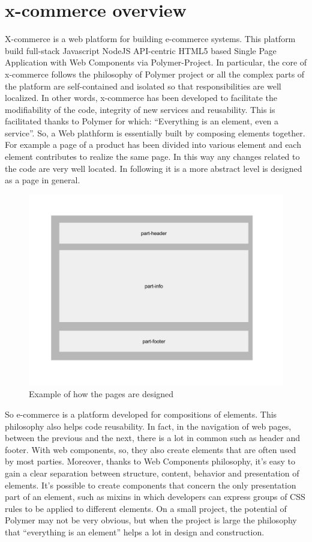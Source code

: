 \section{x-commerce overview}
\label{sec:x_commerce_overview}
X-commerce is a web platform for building e-commerce systems. This platform build full-stack Javascript NodeJS API-centric HTML5 based Single Page Application with Web Components via Polymer-Project. In particular, the core of x-commerce follows the philosophy of Polymer project or all the complex parts of the platform are self-contained and isolated so that responsibilities are well localized. In other words, x-commerce has been developed to facilitate the modifiability of the code, integrity of new services and reusability. This is facilitated thanks to Polymer for which: “Everything is an element, even a service”.
So, a Web plathform is essentially built by composing elements together.
\newline
For example a page of a product has been divided into various element and each element contributes to realize the same page. In this way any changes related to the code are very well located. In following it is a more abstract level is designed as a page in general.
\begin{figure}[htb]
 \centering
 \includegraphics[width=1.0\linewidth]{images/chapter3/design-page.jpg}\hfill
 \caption[Design page]{Example of how the pages are designed}
 \label{fig:design_page}
\end{figure}
So e-commerce is a platform developed for compositions of elements. This philosophy also helps code reusability. In fact, in the navigation of web pages, between the previous and the next, there is a lot in common such as header and footer. With web components, so, they also create elements that are often used by most parties.
Moreover, thanks to Web Components philosophy, it’s easy to gain a clear separation between structure, content, behavior and presentation of elements. It’s possible to create components that concern the only presentation part of an element, such as mixins in which developers can express groups of CSS rules to be applied to different elements.
\newline
On a small project, the potential of Polymer may not be very obvious, but when the project is large the philosophy that “everything is an element” helps a lot in design and construction.